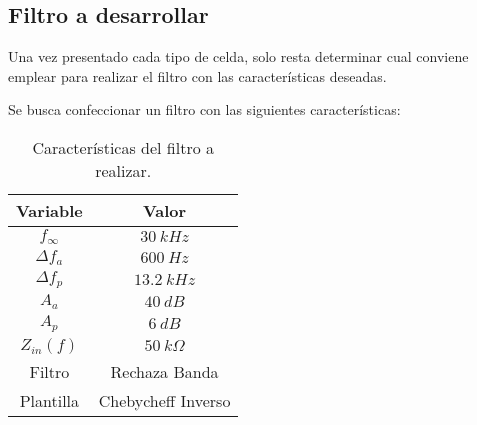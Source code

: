 
\subsection{Filtro a desarrollar}
Una vez presentado cada tipo de celda, solo resta determinar cual conviene emplear para realizar el filtro con las características deseadas.

Se busca confeccionar un filtro con las siguientes características:
\begin{table}[H]
\centering
\begin{tabular}{cc}
\hline
\textbf{Variable} & \textbf{Valor} \\
\hline
$f_\infty$ & $30 \ kHz$ \\
$\Delta f_a$ & $600 \ Hz$ \\
$\Delta f_p$ & $13.2 \ kHz$ \\
$A_a$ & $40 \ dB$ \\
$A_p$ & $6 \ dB$ \\
$Z_{in}(f)$ & $50 \ k\Omega$ \\
Filtro & Rechaza Banda \\
Plantilla & Chebycheff Inverso \\
\hline
\end{tabular}
\caption{Características del filtro a realizar.}
\label{tabla:caracteristicas}
\end{table}

